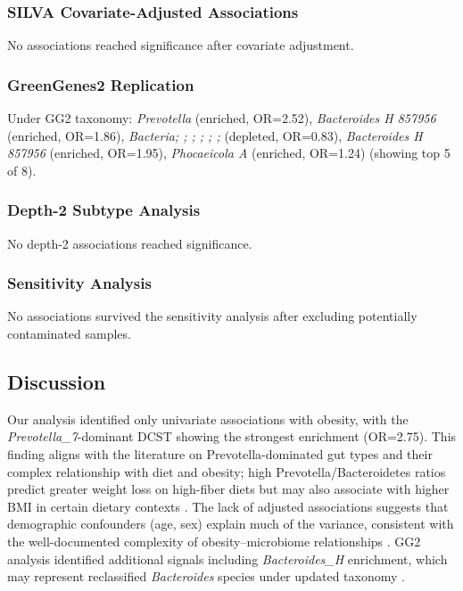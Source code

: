 \documentclass[11pt,a4paper]{article}
\begin{document}
\subsubsection{SILVA Covariate-Adjusted Associations}
No associations reached significance after covariate adjustment.

\subsubsection{GreenGenes2 Replication}
Under GG2 taxonomy: \textit{Prevotella} (enriched, OR=2.52), \textit{Bacteroides H 857956} (enriched, OR=1.86), \textit{Bacteria;  ;  ;  ;  ;  ;  } (depleted, OR=0.83), \textit{Bacteroides H 857956} (enriched, OR=1.95), \textit{Phocaeicola A} (enriched, OR=1.24) (showing top 5 of 8).

\subsubsection{Depth-2 Subtype Analysis}
No depth-2 associations reached significance.

\subsubsection{Sensitivity Analysis}
No associations survived the sensitivity analysis after excluding potentially contaminated samples.

\subsection{Discussion}
Our analysis identified only univariate associations with obesity, with the \textit{Prevotella\_7}-dominant DCST showing the strongest enrichment (OR=2.75). This finding aligns with the literature on Prevotella-dominated gut types and their complex relationship with diet and obesity; high Prevotella/Bacteroidetes ratios predict greater weight loss on high-fiber diets but may also associate with higher BMI in certain dietary contexts \cite{Arumugam2011_enterotypes}. The lack of adjusted associations suggests that demographic confounders (age, sex) explain much of the variance, consistent with the well-documented complexity of obesity--microbiome relationships \cite{Walters2014_meta_obesity}. GG2 analysis identified additional signals including \textit{Bacteroides\_H} enrichment, which may represent reclassified \textit{Bacteroides} species under updated taxonomy \cite{McDonald2024_GG2}.
\newpage
\end{document}
